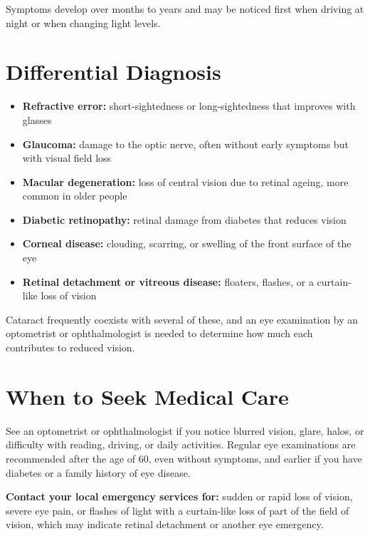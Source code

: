 Symptoms develop over months to years and may be noticed first when driving at night or when changing light levels.

\section*{Differential Diagnosis}
\begin{itemize}
    \item \textbf{Refractive error:} short-sightedness or long-sightedness that improves with glasses
    \item \textbf{Glaucoma:} damage to the optic nerve, often without early symptoms but with visual field loss
    \item \textbf{Macular degeneration:} loss of central vision due to retinal ageing, more common in older people
    \item \textbf{Diabetic retinopathy:} retinal damage from diabetes that reduces vision
    \item \textbf{Corneal disease:} clouding, scarring, or swelling of the front surface of the eye
    \item \textbf{Retinal detachment or vitreous disease:} floaters, flashes, or a curtain-like loss of vision
\end{itemize}

Cataract frequently coexists with several of these, and an eye examination by an optometrist or ophthalmologist is needed to determine how much each contributes to reduced vision.

\section*{When to Seek Medical Care}
See an optometrist or ophthalmologist if you notice blurred vision, glare, halos, or difficulty with reading, driving, or daily activities. Regular eye examinations are recommended after the age of 60, even without symptoms, and earlier if you have diabetes or a family history of eye disease.

\textbf{Contact your local emergency services for:} sudden or rapid loss of vision, severe eye pain, or flashes of light with a curtain-like loss of part of the field of vision, which may indicate retinal detachment or another eye emergency.

